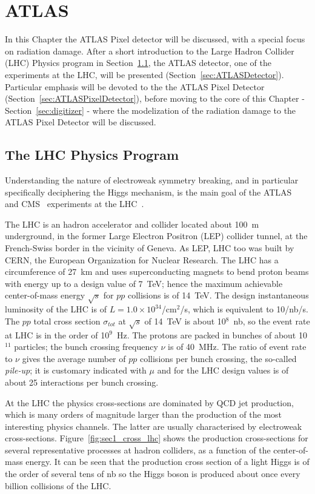 \chapter{ATLAS}
\label{chap:ATLAS}

In this Chapter the ATLAS Pixel detector will be discussed, with a special focus on radiation
 damage. 
After a short introduction to the Large Hadron Collider (LHC) Physics program in 
Section~\ref{sec:LHCPhysics}, the ATLAS detector, one of the experiments at the LHC, will be 
presented (Section~\ref{sec:ATLASDetector}). Particular emphasis will be devoted to the 
the ATLAS Pixel Detector (Section~\ref{sec:ATLASPixelDetector}), before moving to the 
core of this Chapter - Section~\ref{sec:digitizer} -
 where the modelization of the radiation damage to the ATLAS Pixel 
Detector will be discussed. 

\section{The LHC Physics Program}
\label{sec:LHCPhysics}
Understanding the nature of electroweak symmetry breaking, and in particular  specifically 
deciphering the Higgs mechanism, is the main goal of the ATLAS~\cite{AtlasDetector} and 
CMS~\cite{CMSDetector} experiments at the LHC~\cite{LHCMachine}. 

The LHC is an hadron accelerator and collider located about 100~m underground, in the former 
Large Electron Positron (LEP) collider tunnel, at the French-Swiss border in the vicinity of Geneva. As LEP, LHC too was built by CERN, the European 
Organization for Nuclear Research. The LHC has a circumference of 27~km and uses 
superconducting magnets to bend proton beams with energy up to a design value of 7~TeV; hence 
the maximum achievable center-of-mass energy $\sqrt{s}$ for $pp$ collisions is of 14~TeV. The design instantaneous 
luminosity of the LHC is of $L=1.0\times10^{34}$/cm$^{2}$/s, which is equivalent to 10/nb/s. 
The $pp$ total cross section $\sigma_{tot}$ at $\sqrt{s}$ of 14~TeV is about 10$^8$~nb, 
so the event rate at LHC is in the order of 10$^9$~Hz. 
The protons are packed in bunches of about 10$^{11}$ particles; the bunch crossing frequency $\nu$ is 
of 40~MHz.  The ratio of event rate to $\nu$ gives the average number of $pp$ collisions per 
bunch crossing, the so-called {\it pile-up}; it is customary indicated with $\mu$ and for the LHC 
design values is of about 25 interactions per bunch crossing.

At the LHC the physics cross-sections are dominated by QCD 
jet production, which
is many orders of magnitude larger than the production of the
most interesting physics
channels. The latter are usually characterised by electroweak cross-sections. Figure~\ref{fig:sec1_cross_lhc} shows the production cross-sections for several
representative processes at hadron colliders, as a function of the center-of-mass energy.
It can be seen that the  production cross section of a light Higgs is of the order of several tens of nb so 
the Higgs boson is produced about once every billion collisions of the LHC.

